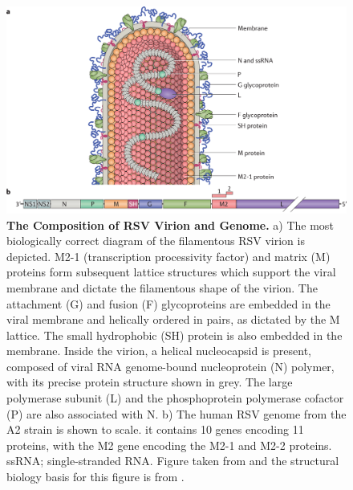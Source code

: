 \begin{figure}
    \centering
    \includegraphics[width=1\linewidth]{04. Introduction//Figs/07. RSV-composition.png}
    \caption[The Composition of RSV Virion and Genome.]{\textbf{The Composition of RSV Virion and Genome.} a) The most biologically correct diagram of the filamentous RSV virion is depicted. M2-1 (transcription processivity factor) and matrix (M) proteins form subsequent lattice structures which support the viral membrane and dictate the filamentous shape of the virion. The attachment (G) and fusion (F) glycoproteins are embedded in the viral membrane and helically ordered in pairs, as dictated by the M lattice. The small hydrophobic (SH) protein is also embedded in the membrane. Inside the virion, a helical nucleocapsid is present, composed of viral RNA genome-bound nucleoprotein (N) polymer, with its precise protein structure shown in grey. The large polymerase subunit (L) and the phosphoprotein polymerase cofactor (P) are also associated with N. b) The human RSV genome from the A2 strain is shown to scale. it contains 10 genes encoding 11 proteins, with the M2 gene encoding the M2-1 and M2-2 proteins. ssRNA; single-stranded RNA. Figure taken from \cite{Battles2019RespiratoryIt} and the structural biology basis for this figure is from \cite{Conley2022HelicalVirus}.}
    \label{fig:The Composition of RSV Virion and Genome}
\end{figure}

